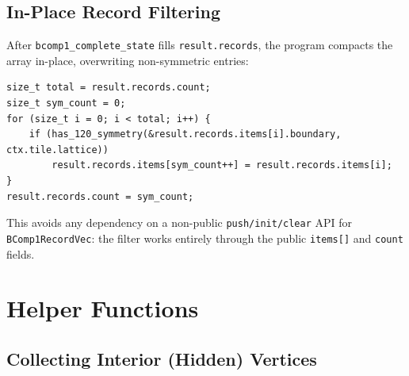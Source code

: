 \documentclass[10pt,a4paper]{article}
\let\polysection\section
\renewcommand\section{\needspace{0.16\textheight}\polysection}
\let\polysubsection\subsection
\renewcommand\subsection{\needspace{0.12\textheight}\polysubsection}
\newcommand{\code}[1]{\texttt{\small #1}}
\begin{document}
\subsection{In-Place Record Filtering}

After \code{bcomp1\_complete\_state} fills \code{result.records}, the
program compacts the array in-place, overwriting non-symmetric entries:

\begin{verbatim}
size_t total = result.records.count;
size_t sym_count = 0;
for (size_t i = 0; i < total; i++) {
    if (has_120_symmetry(&result.records.items[i].boundary, ctx.tile.lattice))
        result.records.items[sym_count++] = result.records.items[i];
}
result.records.count = sym_count;
\end{verbatim}

\noindent This avoids any dependency on a non-public \code{push/init/clear}
API for \code{BComp1RecordVec}: the filter works entirely through the public
\code{items[]} and \code{count} fields.

\section{Helper Functions}

\subsection{Collecting Interior (Hidden) Vertices}
\end{document}
